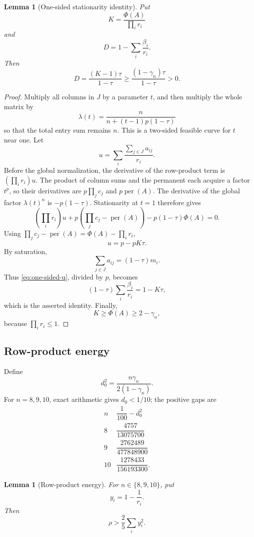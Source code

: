 \documentclass[11pt]{article}
\newtheorem{lemma}[theorem]{Lemma}
\theoremstyle{definition}
\newcommand{\per}{\operatorname{per}}
\newcommand{\1}{\mathbf{1}}
\begin{document}
\begin{lemma}[One-sided stationarity identity]\label{lem:one-sided-stationarity}
Put
\[
 K=\frac{\Phi(A)}{\prod_i r_i}
\]
and
\[
 D=1-\sum_i\frac{\beta_i}{r_i}.
\]
Then
\[
 D=\frac{(K-1)\tau}{1-\tau}
 \ge\frac{(1-\gamma_n)\tau}{1-\tau}>0.
 \tag{7.9}\label{eq:D-lower}
\]
\end{lemma}

\begin{proof}
Multiply all columns in $J$ by a parameter $t$, and then multiply the whole matrix by
\[
 \lambda(t)=
 \frac{n}{n+(t-1)p(1-\tau)}
\]
so that the total entry sum remains $n$.  This is a two-sided feasible curve for $t$ near one.  Let
\[
 u=\sum_i\frac{\sum_{j\in J}a_{ij}}{r_i}.
\]
Before the global normalization, the derivative of the row-product term is $(\prod_i r_i)u$.  The product of column sums and the permanent each acquire a factor $t^p$, so their derivatives are $p\prod_jc_j$ and $p\per(A)$.  The derivative of the global factor $\lambda(t)^n$ is $-p(1-\tau)$.  Stationarity at $t=1$ therefore gives
\[
 \left(\prod_i r_i\right)u
 +p\left(\prod_jc_j-\per(A)\right)
 -p(1-\tau)\Phi(A)=0.
\]
Using $\prod_jc_j-\per(A)=\Phi(A)-\prod_i r_i$,
\[
 u=p-pK\tau.
 \tag{7.10}\label{eq:one-sided-u}
\]
By saturation,
\[
 \sum_{j\in J}a_{ij}=(1-\tau)m_i.
\]
Thus \eqref{eq:one-sided-u}, divided by $p$, becomes
\[
 (1-\tau)\sum_i\frac{\beta_i}{r_i}=1-K\tau,
\]
which is the asserted identity.  Finally,
\[
 K\ge\Phi(A)\ge2-\gamma_n,
\]
because $\prod_i r_i\le1$.
\end{proof}

\subsection{Row-product energy}

Define
\[
 d_0^2=\frac{n\gamma_n}{2(1-\gamma_n)}.
 \tag{7.11}\label{eq:d0}
\]
For $n=8,9,10$, exact arithmetic gives $d_0<1/10$; the positive gaps are
\[
\begin{array}{c|c}
 n&\dfrac1{100}-d_0^2\\ \hline
 8&\dfrac{4757}{13075700}\\[2mm]
 9&\dfrac{2762489}{477848900}\\[2mm]
 10&\dfrac{1278433}{156193300}.
\end{array}
\tag{7.12}\label{eq:d0-gaps}
\]

\begin{lemma}[Row-product energy]\label{lem:row-energy}
For $n\in\{8,9,10\}$, put
\[
 y_i=1-\frac1{r_i}.
\]
Then
\[
 \rho>\frac25\sum_i y_i^2.
 \tag{7.13}\label{eq:row-energy}
\]
\end{lemma}
\end{document}
